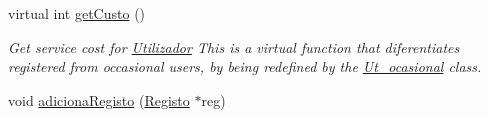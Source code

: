 \begin{DoxyCompactItemize}
\item 
virtual int \hyperlink{class_utilizador_a988e8a7c0cc0625866350a476a5d7b62}{get\+Custo} ()
\begin{DoxyCompactList}\small\item\em Get service cost for \hyperlink{class_utilizador}{Utilizador} This is a virtual function that diferentiates registered from occasional users, by being redefined by the \hyperlink{class_ut__ocasional}{Ut\+\_\+ocasional} class. \end{DoxyCompactList}\item 
\hypertarget{class_utilizador_a388ed972e4a98a3e09aca8edb9ad71a3}{void \hyperlink{class_utilizador_a388ed972e4a98a3e09aca8edb9ad71a3}{adiciona\+Registo} (\hyperlink{class_registo}{Registo} $\ast$reg)}\label{class_utilizador_a388ed972e4a98a3e09aca8edb9ad71a3}


\end{DoxyCompactItemize}
